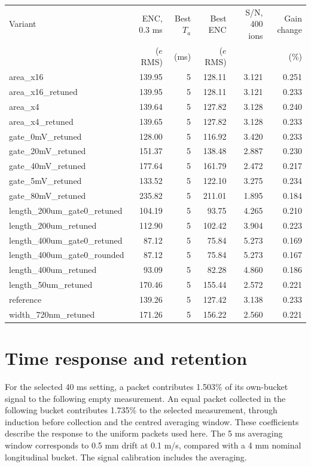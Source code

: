 \documentclass[11pt,a4paper]{article}
\begin{document}
\begin{longtable}{lrrrrr}
\toprule
Variant & ENC, 0.3 ms & Best $T_a$ & Best ENC & S/N, 400 ions & Gain change\\
 & ($e$ RMS) & (ms) & ($e$ RMS) & & (\%)\\\midrule\endhead
area\_x16 & 139.95 & 5 & 128.11 & 3.121 & 0.251 \\
area\_x16\_retuned & 139.95 & 5 & 128.11 & 3.121 & 0.233 \\
area\_x4 & 139.64 & 5 & 127.82 & 3.128 & 0.240 \\
area\_x4\_retuned & 139.65 & 5 & 127.82 & 3.128 & 0.233 \\
gate\_0mV\_retuned & 128.00 & 5 & 116.92 & 3.420 & 0.233 \\
gate\_20mV\_retuned & 151.37 & 5 & 138.48 & 2.887 & 0.230 \\
gate\_40mV\_retuned & 177.64 & 5 & 161.79 & 2.472 & 0.217 \\
gate\_5mV\_retuned & 133.52 & 5 & 122.10 & 3.275 & 0.234 \\
gate\_80mV\_retuned & 235.82 & 5 & 211.01 & 1.895 & 0.184 \\
length\_200um\_gate0\_retuned & 104.19 & 5 & 93.75 & 4.265 & 0.210 \\
length\_200um\_retuned & 112.90 & 5 & 102.42 & 3.904 & 0.223 \\
length\_400um\_gate0\_retuned & 87.12 & 5 & 75.84 & 5.273 & 0.169 \\
length\_400um\_gate0\_rounded & 87.12 & 5 & 75.84 & 5.273 & 0.167 \\
length\_400um\_retuned & 93.09 & 5 & 82.28 & 4.860 & 0.186 \\
length\_50um\_retuned & 170.46 & 5 & 155.44 & 2.572 & 0.221 \\
reference & 139.26 & 5 & 127.42 & 3.138 & 0.233 \\
width\_720nm\_retuned & 171.26 & 5 & 156.22 & 2.560 & 0.221 \\
\bottomrule\end{longtable}
\normalsize

\section{Time response and retention}
For the selected 40 ms setting, a packet contributes 1.503\% of its
own-bucket signal to the following empty measurement. An equal packet collected
in the following bucket contributes 1.735\% to the selected measurement,
through induction before collection and the centred averaging window. These
coefficients describe the response to the uniform packets used here.
The 5 ms averaging window corresponds to 0.5 mm drift at 0.1 m/s, compared with
a 4 mm nominal longitudinal bucket. The signal calibration includes the averaging.
\end{document}
